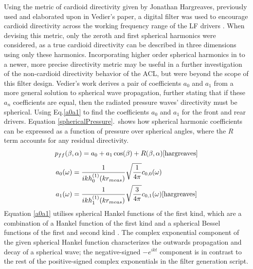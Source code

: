 \documentclass{report}
\begin{document}
            Using the metric of cardioid directivity given by Jonathan Hargreaves, previously used and elaborated upon in Vedier's paper, a digital filter was used to encourage cardioid directivity across the working frequency range of the LF drivers \cite{vedier}.
            When devising this metric, only the zeroth and first spherical harmonics were considered, as a true cardioid directivity can be described in three dimensions using only these harmonics.
            Incorporating higher order spherical harmonics in to a newer, more precise directivity metric may be useful in a further investigation of the non-cardioid directivity behavior of the ACL, but were beyond the scope of this filter design.
            Vedier's work derives a pair of coefficients $a_0$ and $a_1$ from a more general solution to spherical wave propagation, further stating that if these $a_n$ coefficients are equal, then the radiated pressure waves' directivity must be spherical.
            Using Eq.\ref{a0a1} to find the coefficients $a_0$ and $a_1$ for the front and rear drivers.
            Equation \ref{sphericalPressure}.\ shows how spherical harmonic coefficients can be expressed as a function of pressure over spherical angles, where the $R$ term accounts for any residual directivity.
            \begin{equation}
                p_{ff}(\beta,\alpha) = a_0 + a_1 \cos(\beta) + R(\beta,\alpha)
                \label{sphericalPressure}
                \cite{hargreaves}
            \end{equation}
            \begin{equation}
                \begin{split}
                    a_0(\omega) &= \frac{1}{ikh_0^{(1)}(kr_{meas})} \sqrt{\frac{1}{4\pi}} c_{0,0}(\omega) \\
                    a_1(\omega) &= \frac{1}{ikh_1^{(1)}(kr_{meas})} \sqrt{\frac{3}{4\pi}} c_{0,1}(\omega)
                    \label{a0a1}\cite{hargreaves}
                \end{split}
            \end{equation}
            Equation \ref{a0a1} utilises spherical Hankel functions of the first kind, which are a combination of a Hankel function of the first kind and a spherical Bessel functions of the first and second kind \cite{weisstein}.
            The complex exponential component of the given spherical Hankel function characterizes the outwards propagation and decay of a spherical wave; the negative-signed $-e^{ikt}$ component is in contrast to the rest of the positive-signed complex exponentials in the filter generation script.
\end{document}
